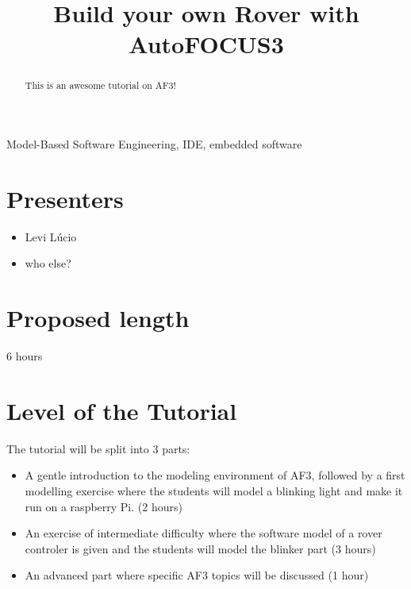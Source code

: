\documentclass[conference]{IEEEtran}
\begin{document}
 
\title{Build your own Rover with AutoFOCUS3\\
}

\author{
}

\maketitle 

\begin{abstract}
This is an awesome tutorial on AF3! 
\end{abstract}

\begin{IEEEkeywords}
Model-Based Software Engineering, IDE, embedded software
\end{IEEEkeywords}

\section{Presenters}
\begin{itemize}
  \item Levi L\'ucio
  \item who else?
\end{itemize}

\section{Proposed length}

6 hours

\section{Level of the Tutorial}

The tutorial will be split into 3 parts:

\begin{itemize}
  \item A gentle introduction to the modeling environment of AF3, followed by a
  first modelling exercise where the students will model a blinking light and
  make it run on a raspberry Pi.
  (2 hours)
  \item An exercise of intermediate difficulty where the software model of a
  rover controler is given and the students will model the blinker part (3
  hours)
  \item An advanced part where specific AF3 topics will be discussed (1 hour)
\end{itemize}
\end{document}
